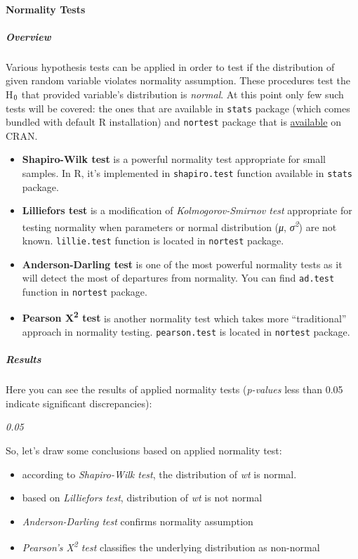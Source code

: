 \documentclass[]{article}
\newcommand{\textsubscr}[1]{\ensuremath{_{\scriptsize\textrm{#1}}}}
\begin{document}
\paragraph{Normality Tests}

\subparagraph{Overview}

Various hypothesis tests can be applied in order to test if the
distribution of given random variable violates normality assumption.
These procedures test the H\textsubscr{0} that provided variable's
distribution is \emph{normal}. At this point only few such tests will be
covered: the ones that are available in \texttt{stats} package (which
comes bundled with default R installation) and \texttt{nortest} package
that is
\href{http://cran.r-project.org/web/packages/nortest/index.html}{available}
on CRAN.

\begin{itemize}
\item
  \textbf{Shapiro-Wilk test} is a powerful normality test appropriate
  for small samples. In R, it's implemented in \texttt{shapiro.test}
  function available in \texttt{stats} package.
\item
  \textbf{Lilliefors test} is a modification of \emph{Kolmogorov-Smirnov
  test} appropriate for testing normality when parameters or normal
  distribution (\emph{μ}, \emph{σ\textsuperscript{2}}) are not known.
  \texttt{lillie.test} function is located in \texttt{nortest} package.
\item
  \textbf{Anderson-Darling test} is one of the most powerful normality
  tests as it will detect the most of departures from normality. You can
  find \texttt{ad.test} function in \texttt{nortest} package.
\item
  \textbf{Pearson Χ\textsuperscript{2} test} is another normality test
  which takes more ``traditional'' approach in normality testing.
  \texttt{pearson.test} is located in \texttt{nortest} package.
\end{itemize}
\subparagraph{Results}

Here you can see the results of applied normality tests (\emph{p-values}
less than 0.05 indicate significant discrepancies):

\emph{0.05}

So, let's draw some conclusions based on applied normality test:

\begin{itemize}
\item
  according to \emph{Shapiro-Wilk test}, the distribution of \emph{wt}
  is normal.
\item
  based on \emph{Lilliefors test}, distribution of \emph{wt} is not
  normal
\item
  \emph{Anderson-Darling test} confirms normality assumption
\item
  \emph{Pearson's Χ\textsuperscript{2} test} classifies the underlying
  distribution as non-normal
\end{itemize}
\end{document}
